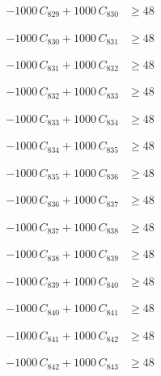 \documentclass[a4paper,11pt]{article}
\begin{document}
\begin{align}
-1000\,C_{829} + 1000\,C_{830} &\geq 48 \nonumber
\end{align}

\begin{align}
-1000\,C_{830} + 1000\,C_{831} &\geq 48 \nonumber
\end{align}

\begin{align}
-1000\,C_{831} + 1000\,C_{832} &\geq 48 \nonumber
\end{align}

\begin{align}
-1000\,C_{832} + 1000\,C_{833} &\geq 48 \nonumber
\end{align}

\begin{align}
-1000\,C_{833} + 1000\,C_{834} &\geq 48 \nonumber
\end{align}

\begin{align}
-1000\,C_{834} + 1000\,C_{835} &\geq 48 \nonumber
\end{align}

\begin{align}
-1000\,C_{835} + 1000\,C_{836} &\geq 48 \nonumber
\end{align}

\begin{align}
-1000\,C_{836} + 1000\,C_{837} &\geq 48 \nonumber
\end{align}

\begin{align}
-1000\,C_{837} + 1000\,C_{838} &\geq 48 \nonumber
\end{align}

\begin{align}
-1000\,C_{838} + 1000\,C_{839} &\geq 48 \nonumber
\end{align}

\begin{align}
-1000\,C_{839} + 1000\,C_{840} &\geq 48 \nonumber
\end{align}

\begin{align}
-1000\,C_{840} + 1000\,C_{841} &\geq 48 \nonumber
\end{align}

\begin{align}
-1000\,C_{841} + 1000\,C_{842} &\geq 48 \nonumber
\end{align}

\begin{align}
-1000\,C_{842} + 1000\,C_{843} &\geq 48 \nonumber
\end{align}
\end{document}
